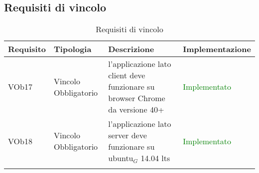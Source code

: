 \subsection{ Requisiti di vincolo}
	
\begin{longtable}{|l|p{2.5cm}|p{5cm}|p{3.5cm}|}
\hline
\textbf{Requisito} & \textbf{Tipologia} & \textbf{Descrizione} & \textbf{Implementazione} \\
\hline
VOb17 & Vincolo \linebreak Obbligatorio & l'applicazione lato client deve funzionare su browser Chrome da versione 40+ & \textcolor{green}{Implementato} \\
\hline
VOb18 & Vincolo \linebreak Obbligatorio & l'applicazione lato server deve funzionare su ubuntu$_G$ 14.04 lts & \textcolor{green}{Implementato} \\
\hline
\caption{Requisiti di vincolo}
\end{longtable}